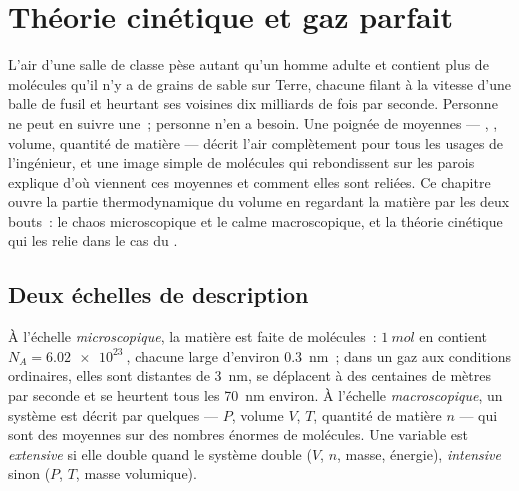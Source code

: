 \chapter{Théorie cinétique et gaz parfait}\label{ch:b1:kinetic-theory}

L'air d'une salle de classe pèse autant qu'un homme adulte et contient
plus de molécules qu'il n'y a de grains de sable sur Terre, chacune
filant à la vitesse d'une balle de fusil et heurtant ses voisines dix
milliards de fois par seconde. Personne ne peut en suivre une~; personne
n'en a besoin. Une poignée de moyennes --- , ,
volume, quantité de matière --- décrit l'air complètement pour tous les
usages de l'ingénieur, et une image simple de molécules qui rebondissent
sur les parois explique d'où viennent ces moyennes et comment elles sont
reliées. Ce chapitre ouvre la partie thermodynamique du volume en
regardant la matière par les deux bouts~: le chaos microscopique et le
calme macroscopique, et la théorie cinétique qui les relie dans le cas
du .

\section{Deux échelles de description}

\begin{definition}\label{def:b1:kinetic-theory:scales}
À l'échelle \emph{microscopique}, la matière est faite de molécules~:
$\qty{1}{mol}$ en contient $N_A = \qty{6.02e23}{}$, chacune large
d'environ \qty{0.3}{nm}~; dans un gaz aux conditions ordinaires, elles
sont distantes de \qty{3}{nm}, se déplacent à des centaines de mètres
par seconde et se heurtent tous les \qty{70}{nm} environ. À l'échelle
\emph{macroscopique}, un système est décrit par quelques
\emph{} ---  $P$, volume $V$,  $T$,
quantité de matière $n$ --- qui sont des moyennes sur des nombres
énormes de molécules. Une variable est \emph{extensive} si elle double
quand le système double ($V$, $n$, masse, énergie), \emph{intensive}
sinon ($P$, $T$, masse volumique).
\end{definition}

